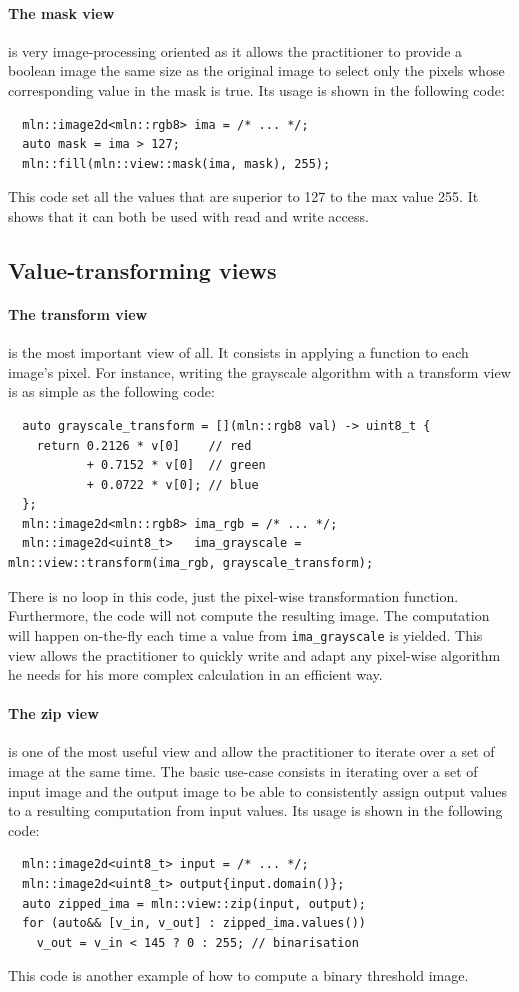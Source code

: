 \paragraph{The mask view} is very image-processing oriented as it allows the practitioner to provide a boolean image the
same size as the original image to select only the pixels whose corresponding value in the mask is true. Its usage is
shown in the following code:
\begin{verbatim}
  mln::image2d<mln::rgb8> ima = /* ... */;
  auto mask = ima > 127;
  mln::fill(mln::view::mask(ima, mask), 255);
\end{verbatim}
This code set all the values that are superior to 127 to the max value 255. It shows that it can both be used with read
and write access.


\subsection{Value-transforming views}

\paragraph{The transform view} is the most important view of all. It consists in applying a function to each image's
pixel. For instance, writing the grayscale algorithm with a transform view is as simple as the following code:
\begin{verbatim}
  auto grayscale_transform = [](mln::rgb8 val) -> uint8_t {
    return 0.2126 * v[0]    // red
           + 0.7152 * v[0]  // green
           + 0.0722 * v[0]; // blue
  };
  mln::image2d<mln::rgb8> ima_rgb = /* ... */;
  mln::image2d<uint8_t>   ima_grayscale = mln::view::transform(ima_rgb, grayscale_transform);
\end{verbatim}
There is no loop in this code, just the pixel-wise transformation function. Furthermore, the code will not compute the
resulting image. The computation will happen on-the-fly each time a value from \texttt{ima\_grayscale} is yielded.
This view allows the practitioner to quickly write and adapt any pixel-wise algorithm he needs for his more complex
calculation in an efficient way.

\paragraph{The zip view} is one of the most useful view and allow the practitioner to iterate over a set of image at the
same time. The basic use-case consists in iterating over a set of input image and the output image to be able to
consistently assign output values to a resulting computation from input values. Its usage is shown in the following
code:
\begin{verbatim}
  mln::image2d<uint8_t> input = /* ... */;
  mln::image2d<uint8_t> output{input.domain()};
  auto zipped_ima = mln::view::zip(input, output);
  for (auto&& [v_in, v_out] : zipped_ima.values())
    v_out = v_in < 145 ? 0 : 255; // binarisation
\end{verbatim}
This code is another example of how to compute a binary threshold image.

